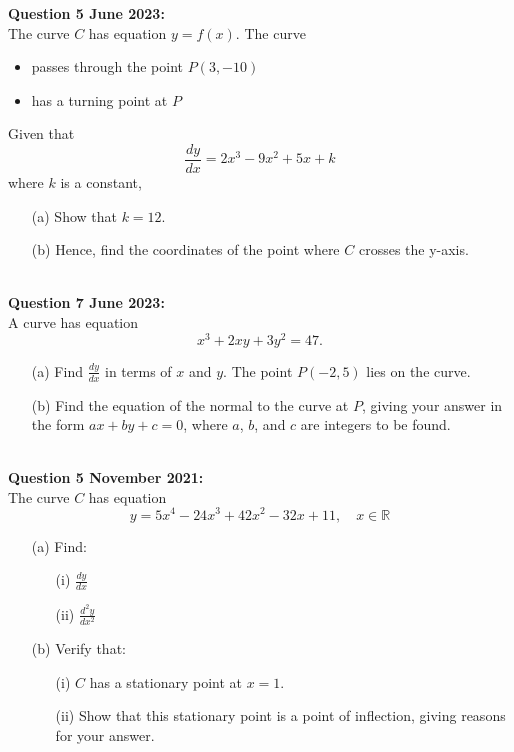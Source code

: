 \documentclass[12pt]{article}
\begin{document}
\textbf{Question 5 June 2023:}\\
The curve \( C \) has equation \( y = f(x) \). The curve
\begin{itemize}
    \item passes through the point \( P(3, -10) \)
    \item has a turning point at \( P \)
\end{itemize}

Given that 
\[\frac{dy}{dx} = 2x^3 - 9x^2 + 5x + k\]
where \( k \) is a constant,
\begin{enumerate}
    \item[(a)] Show that \( k = 12 \).
    \item[(b)] Hence, find the coordinates of the point where \( C \) crosses the y-axis.\\\\
\end{enumerate}

\textbf{Question 7 June 2023:}\\
A curve has equation
\[x^3 + 2xy + 3y^2 = 47.\]
\begin{enumerate}
    \item[(a)] Find \( \frac{dy}{dx} \) in terms of \( x \) and \( y \). 
    The point \( P(-2, 5) \) lies on the curve.    
    \item[(b)] Find the equation of the normal to the curve at \( P \), giving your answer in the form \( ax + by + c = 0 \), where \( a \), \( b \), and \( c \) are integers to be found.\\\\
\end{enumerate}

\textbf{Question 5 November 2021:}\\
The curve \( C \) has equation 
\[y = 5x^4 - 24x^3 + 42x^2 - 32x + 11, \quad x \in \mathbb{R}\]
\begin{enumerate}
    \item[(a)] Find:
    \begin{enumerate}
        \item[(i)] \( \frac{dy}{dx} \)
        \item[(ii)] \( \frac{d^2y}{dx^2} \)
    \end{enumerate}  
    \item[(b)] Verify that:
    \begin{enumerate}
        \item[(i)] \( C \) has a stationary point at \( x = 1 \).
        \item[(ii)] Show that this stationary point is a point of inflection, giving reasons for your answer.
    \end{enumerate}    
\end{enumerate}

\pagebreak 


\pagebreak 

\nocite{*}
\printbibliography{}
\end{document}
